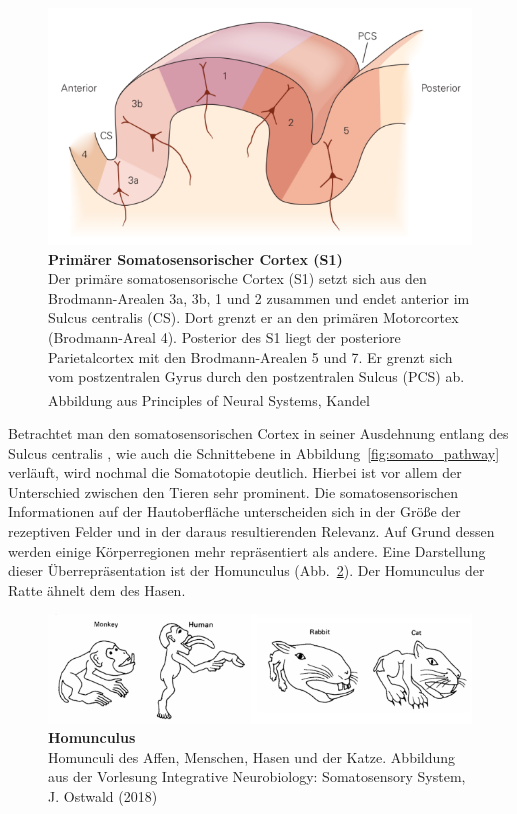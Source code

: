 \documentclass[12pt,a4paper,pdftex]{article}
\begin{document}
\begin{figure}[H]
    \centering
    \includegraphics{pictures/somatosensory/S1_Cortex.png}
    \caption[Primärer Somatosensorischer Cortex]{\textbf{Primärer Somatosensorischer Cortex (S1)}\\
    Der primäre somatosensorische Cortex (S1) setzt sich aus den Brodmann-Arealen 3a, 3b, 1 und 2 zusammen und endet anterior im Sulcus centralis (CS). Dort grenzt er an den primären Motorcortex (Brodmann-Areal 4). Posterior des S1 liegt der posteriore Parietalcortex mit den Brodmann-Arealen 5 und 7. Er grenzt sich vom postzentralen Gyrus durch den postzentralen Sulcus (PCS) ab. Abbildung aus Principles of Neural Systems, Kandel
    \textsuperscript{\cite[23]{kandel2013principles}}}
    \label{fig:S1_Cortex}
\end{figure}

Betrachtet man den somatosensorischen Cortex in seiner Ausdehnung entlang des Sulcus centralis , wie auch die Schnittebene in Abbildung~\ref{fig:somato_pathway} verläuft, wird nochmal die Somatotopie  deutlich. Hierbei ist vor allem der Unterschied zwischen den Tieren sehr prominent. Die somatosensorischen Informationen auf der Hautoberfläche unterscheiden sich in der Größe der rezeptiven Felder und in der daraus resultierenden Relevanz. Auf Grund dessen werden einige Körperregionen mehr repräsentiert als andere. Eine Darstellung dieser Überrepräsentation ist der Homunculus (Abb.~\ref{fig:somato_homunculus}). Der Homunculus  der Ratte ähnelt dem des Hasen.


\begin{figure}[H]
    \centering
    \includegraphics[width = \textwidth] {pictures/somatosensory/homunculus.png}
    \caption[Homunculus]{\textbf{Homunculus}\\
    Homunculi des Affen, Menschen, Hasen und der Katze. Abbildung aus der Vorlesung Integrative Neurobiology: Somatosensory System, J. Ostwald (2018)}
    \label{fig:somato_homunculus}
\end{figure}
\end{document}
